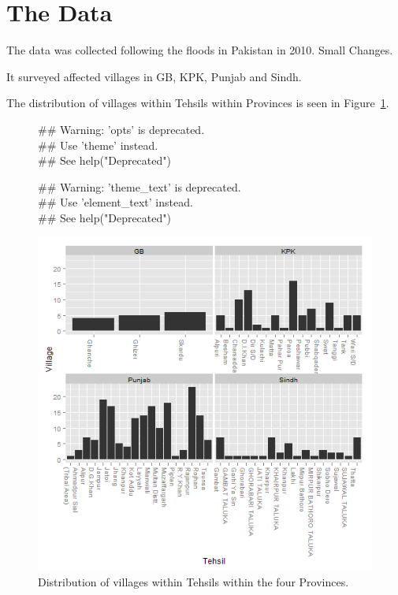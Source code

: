 \section{The Data}
\label{sec:thedata}


The data was collected following the floods in Pakistan in 2010. Small Changes.

It surveyed affected villages in GB, KPK, Punjab and Sindh.




The distribution of villages within Tehsils within Provinces is seen in Figure~\ref{fig:VillageDist}.

\begin{figure}[!hbtp]
\begin{knitrout}
\color{fgcolor}\begin{kframe}


{\ttfamily\noindent\textcolor{warningcolor}{\#\# Warning: 'opts' is deprecated.\\\#\# Use 'theme' instead.\\\#\# See help("Deprecated")}}

{\ttfamily\noindent\textcolor{warningcolor}{\#\# Warning: 'theme\_text' is deprecated.\\\#\# Use 'element\_text' instead.\\\#\# See help("Deprecated")}}\end{kframe}\includegraphics[width=.9\linewidth]{thedata/figures/VillDistPlot} 
\end{knitrout}

\caption{Distribution of villages within Tehsils within the four Provinces.\label{fig:VillageDist}}
\end{figure}

